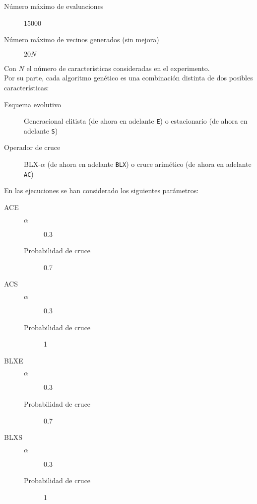 \documentclass[11pt]{article}
\theoremstyle{plain}
\theoremstyle{definition}
\begin{document}
\begin{description}
\item[Número máximo de evaluaciones] 15000
\item[Número máximo de vecinos generados (sin mejora)] $20N$
\end{description}

Con $N$ el número de características consideradas en el experimento. \\

Por su parte, cada algoritmo genético es una combinación distinta de dos posibles características:

\begin{description}
\item[Esquema evolutivo] Generacional elitista (de ahora en adelante \texttt{E}) o estacionario (de ahora en adelante \texttt{S})
\item[Operador de cruce] BLX-$\alpha$ (de ahora en adelante \texttt{BLX}) o cruce arimético (de ahora en adelante \texttt{AC})
\end{description}

En las ejecuciones se han considerado los siguientes parámetros:

\begin{description}
\item[ACE] \hfill
  \begin{description}
  \item[$\alpha$] 0.3
  \item[Probabilidad de cruce] 0.7
  \end{description}
\item[ACS] \hfill
  \begin{description}
  \item[$\alpha$] 0.3
  \item[Probabilidad de cruce] 1
  \end{description}
\item[BLXE] \hfill
  \begin{description}
  \item[$\alpha$] 0.3
  \item[Probabilidad de cruce] 0.7
  \end{description}
\item[BLXS] \hfill
  \begin{description}
  \item[$\alpha$] 0.3
  \item[Probabilidad de cruce] 1
  \end{description}
\end{description}
\end{document}
